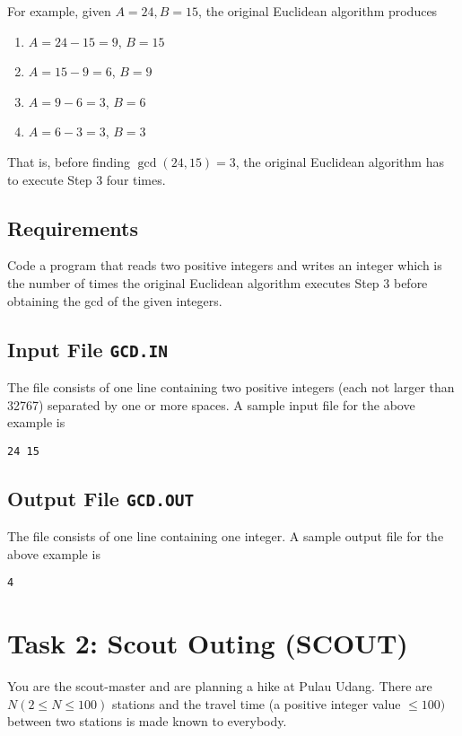 For example, given $A = 24, B = 15$,
the original Euclidean algorithm produces
\begin{enumerate}
\item	$A = 24-15 = 9$, $B = 15$
\item	$A = 15-9 = 6$, $B = 9$
\item	$A = 9-6 = 3$, $B = 6$
\item	$A = 6-3 = 3$, $B = 3$
\end{enumerate}
That is,
before finding $\gcd(24,15) = 3$,
the original Euclidean algorithm has to execute Step 3 four times.

\clearpage

\subsection{Requirements}

Code a program that reads two positive integers
and writes an integer which is
the number of times
the original Euclidean algorithm
executes Step 3
before obtaining the gcd of the given integers.

\subsection{Input File {\tt GCD.IN}}

The file consists of one line containing two positive integers
(each not larger than 32767)
separated by one or more spaces.
A sample input file for the above example is
\begin{verbatim}
24 15
\end{verbatim}

\subsection{Output File {\tt GCD.OUT}}

The file consists of one line containing one
integer.
A sample output file for the above example is
\begin{verbatim}
4
\end{verbatim}

\newpage

\section*{Task 2: Scout Outing (SCOUT)}
\setcounter{section}{2}
\setcounter{subsection}{0}

You are the scout-master and are planning a hike at Pulau Udang.
There are $N (2 \leq N \leq 100)$ stations and the travel time
(a positive integer value $\leq 100)$ between two stations is made
known to everybody.

